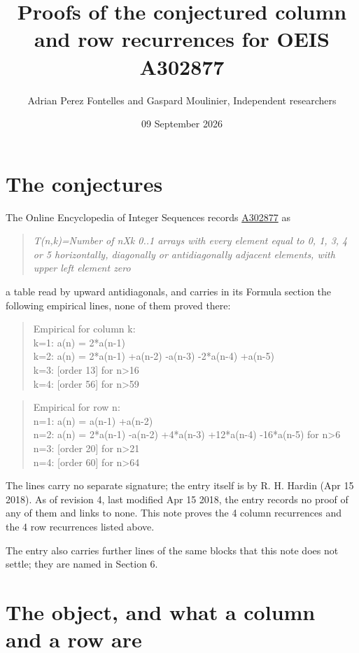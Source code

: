 \documentclass[11pt]{article}
\title{Proofs of the conjectured column and row recurrences for OEIS A302877}
\author{Adrian Perez Fontelles and Gaspard Moulinier, Independent researchers}
\date{09 September 2026}
\theoremstyle{definition}
\begin{document}
\maketitle
\section{The conjectures}

The Online Encyclopedia of Integer Sequences records \href{https://oeis.org/A302877}{A302877} as

\begin{quote}\itshape T(n,k)=Number of nXk 0..1 arrays with every element equal to 0, 1, 3, 4 or 5 horizontally, diagonally or antidiagonally adjacent elements, with upper left element zero\end{quote}

a table read by upward antidiagonals, and carries in its Formula section the following empirical lines, none of them proved there:

\begin{quote}\ttfamily Empirical for column k:\\
k=1: a(n) = 2*a(n-1)\\k=2: a(n) = 2*a(n-1) +a(n-2) -a(n-3) -2*a(n-4) +a(n-5)\\k=3: [order 13] for n>16\\k=4: [order 56] for n>59\end{quote}

\begin{quote}\ttfamily Empirical for row n:\\
n=1: a(n) = a(n-1) +a(n-2)\\n=2: a(n) = 2*a(n-1) -a(n-2) +4*a(n-3) +12*a(n-4) -16*a(n-5) for n>6\\n=3: [order 20] for n>21\\n=4: [order 60] for n>64\end{quote}

The lines carry no separate signature; the entry itself is by R. H. Hardin (Apr 15 2018). As of revision 4, last modified Apr 15 2018, the entry records no proof of any of them and links to none. This note proves the 4 column recurrences and the 4 row recurrences listed above.

The entry also carries further lines of the same blocks that this note does not settle; they are named in Section 6.

\section{The object, and what a column and a row are}
\end{document}
